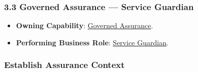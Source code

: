 \subsubsection*{3.3 Governed Assurance — Service Guardian}
\label{rad:assurance:93}

\begin{itemize}

\item 
\textbf{Owning Capability}: \hyperref[rad:enabling:694]{Governed Assurance}.



\item 
\textbf{Performing Business Role}: \href{https://github.com/fhirfactory/harmonia/blob/98410db60155198a75f74c79d98060070209faa1/docs/markdown/03-business-architecture/actors-roles/roles.md\#service-guardian}{Service Guardian}.



\end{itemize}
\label{rad:assurance:96}



\label{rad:assurance:98}
\subsubsection*{Establish Assurance Context}
\label{rad:assurance:100}


